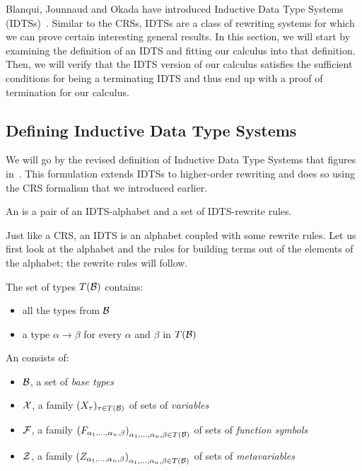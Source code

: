 Blanqui, Jounnaud and Okada have introduced Inductive Data Type Systems
(IDTSs)~\cite{blanqui2002inductive,blanqui2000termination}. Similar to the
CRSs, IDTSs are a class of rewriting systems for which we can prove certain
interesting general results. In this section, we will start by examining
the definition of an IDTS and fitting our calculus into that
definition. Then, we will verify that the IDTS version of our calculus
satisfies the sufficient conditions for being a terminating IDTS and thus
end up with a proof of termination for our calculus.

\subsection{Defining Inductive Data Type Systems}
\label{ssec:defining-idtss}

We will go by the revised definition of Inductive Data Type Systems that
figures in~\cite{blanqui2000termination}. This formulation extends IDTSs to
higher-order rewriting and does so using the CRS formalism that we
introduced earlier.

\begin{definition}
  An  is a pair of an IDTS-alphabet
  and a set of IDTS-rewrite rules.
\end{definition}

Just like a CRS, an IDTS is an alphabet coupled with some rewrite
rules. Let us first look at the alphabet and the rules for building terms
out of the elements of the alphabet; the rewrite rules will follow.

\begin{definition}
  The set of types $T(\mathcal{B})$ contains:
  \begin{itemize}
  \item all the types from $\mathcal{B}$
  \item a type $\alpha \to \beta$ for every $\alpha$ and $\beta$ in $T(\mathcal{B})$
  \end{itemize}
\end{definition}

\begin{definition}
  An  consists of:
  \begin{itemize}
  \item $\mathcal{B}$, a set of \emph{base types}
  \item $\mathcal{X}$, a family $(X_\tau)_{\tau \in T(\mathcal{B})}$ of sets of \emph{variables}
  \item $\mathcal{F}$, a family ${(F_{\alpha_1,\ldots,\alpha_n,\beta})}_{\alpha_1,\ldots,\alpha_n,\beta \in T(\mathcal{B})}$ of sets of \emph{function symbols}
  \item $\mathcal{Z}$, a family ${(Z_{\alpha_1,\ldots,\alpha_n,\beta})}_{\alpha_1,\ldots,\alpha_n,\beta \in T(\mathcal{B})}$ of sets of
    \emph{metavariables}
  \end{itemize}
\end{definition}

